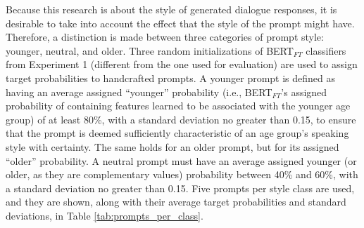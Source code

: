 Because this research is about the style of generated dialogue responses, it is desirable to take into account the effect that the style of the prompt might have. Therefore, a distinction is made between three categories of prompt style: younger, neutral, and older. Three random initializations of BERT$_{FT}$ classifiers from Experiment 1 (different from the one used for evaluation) are used to assign target probabilities to handcrafted prompts. A younger prompt is defined as having an average assigned ``younger'' probability (i.e., BERT$_{FT}$'s assigned probability of containing features learned to be associated with the younger age group) of at least 80\%, with a standard deviation no greater than 0.15, to ensure that the prompt is deemed sufficiently characteristic of an age group's speaking style with certainty. The same holds for an older prompt, but for its assigned ``older'' probability. A neutral prompt must have an average assigned younger (or older, as they are complementary values) probability between 40\% and 60\%, with a standard deviation no greater than 0.15. Five prompts per style class are used, and they are shown, along with their average target probabilities and standard deviations, in Table \ref{tab:prompts_per_class}. 

